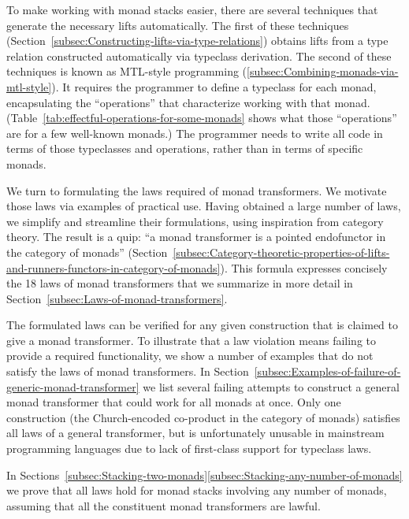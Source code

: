 To make working with monad stacks easier, there are several techniques
that generate the necessary lifts automatically. The first of these
techniques (Section~\ref{subsec:Constructing-lifts-via-type-relations})
obtains lifts from a type relation constructed automatically via typeclass
derivation. The second of these techniques is known as MTL-style programming
(\ref{subsec:Combining-monads-via-mtl-style}). It requires the programmer
to define a typeclass for each monad, encapsulating the \textsf{``}operations\textsf{''}
that characterize working with that monad. (Table~\ref{tab:effectful-operations-for-some-monads}
shows what those \textsf{``}operations\textsf{''} are for a few well-known monads.)
The programmer needs to write all code in terms of those typeclasses
and operations, rather than in terms of specific monads.

We turn to formulating the laws required of monad transformers. We
motivate those laws via examples of practical use. Having obtained
a large number of laws, we simplify and streamline their formulations,
using inspiration from category theory. The result is a quip: \textsf{``}a
monad transformer is a pointed endofunctor in the category of monads\textsf{''}
(Section~\ref{subsec:Category-theoretic-properties-of-lifts-and-runners-functors-in-category-of-monads}).
This formula expresses concisely the 18 laws of monad transformers
that we summarize in more detail in Section~\ref{subsec:Laws-of-monad-transformers}.

The formulated laws can be verified for any given construction that
is claimed to give a monad transformer. To illustrate that a law violation
means failing to provide a required functionality, we show a number
of examples that do not satisfy the laws of monad transformers. In
Section~\ref{subsec:Examples-of-failure-of-generic-monad-transformer}
we list several failing attempts to construct a general monad transformer
that could work for all monads at once. Only one construction (the
Church-encoded co-product in the category of monads) satisfies all
laws of a general transformer, but is unfortunately unusable in mainstream
programming languages due to lack of first-class support for typeclass
laws.

In Sections~\ref{subsec:Stacking-two-monads}\textendash \ref{subsec:Stacking-any-number-of-monads}
we prove that all laws hold for monad stacks involving any number
of monads, assuming that all the constituent monad transformers are
lawful.

